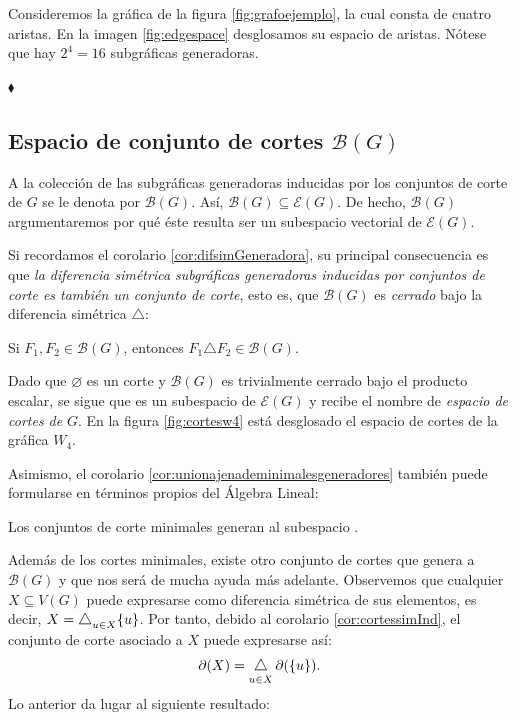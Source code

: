 \begin{ejem}
 Consideremos la gráfica de la figura \ref{fig:grafoejemplo}, la cual consta de cuatro aristas. En la imagen \ref{fig:edgespace} desglosamos su espacio de aristas. Nótese que hay $2^{4} = 16$ subgráficas generadoras.
 
 
\hfill $\blacklozenge$ 
\end{ejem}


\subsection{Espacio de conjunto de cortes $\mathcal{B}(G)$}
A la colección de las subgráficas generadoras inducidas por los conjuntos de corte de $G$ se  le denota por $\mathcal{B}(G)$. Así, $\mathcal{B}(G) \subseteq \mathcal{E}(G)$. De hecho, $\mathcal{B}(G)$ argumentaremos por qué éste resulta ser un subespacio vectorial de $\mathcal{E}(G)$.  

 Si recordamos el corolario \ref{cor:difsimGeneradora}, su principal consecuencia es que \textit{la diferencia simétrica subgráficas generadoras inducidas por conjuntos de corte es también un conjunto de corte}, esto es, que $\mathcal{B}(G)$ es \textit{cerrado} bajo la diferencia simétrica $\triangle$: 

\begin{teo} \label{teo:difsimcortes}
\begin{center}
    Si $F_{1}, F_{2} \in \mathcal{B}(G)$, entonces $F_{1} \triangle F_{2} \in \mathcal{B}(G)$.
\end{center}
\end{teo}

Dado que $\varnothing$ es un corte y $\mathcal{B}(G)$ es trivialmente cerrado bajo el producto escalar, se sigue que \bond es un subespacio de $\mathcal{E}(G)$ y recibe el nombre de \textit{espacio de cortes de} $G$. En la figura \ref{fig:cortesw4} está desglosado el espacio de cortes de la gráfica $W_{4}$.

Asimismo, el corolario \ref{cor:unionajenademinimalesgeneradores} también puede formularse en términos propios del Álgebra Lineal:

\begin{teo}
\begin{center}
    Los conjuntos de corte minimales generan al subespacio \bondt.
\end{center}
\end{teo}


Además de los cortes minimales, existe otro conjunto de cortes que genera a $\mathcal{B}(G)$ y que nos será de mucha ayuda más adelante. Observemos que cualquier $X \subseteq V(G)$ puede expresarse como diferencia simétrica de sus elementos, es decir, $X = \difsym_{u \in X} \{u\}$. Por tanto, debido al corolario \ref{cor:cortessimInd}, el conjunto de corte asociado a $X$ puede expresarse así:
$$
\partial(X) = \difsym_{u \in X} \partial(\{u\}).
$$
Lo anterior da lugar al siguiente resultado:

